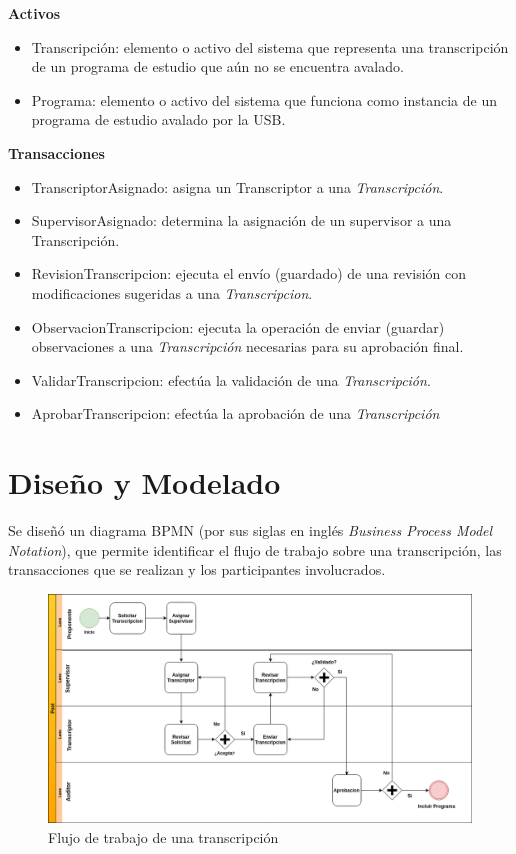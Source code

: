 \textbf{Activos} 
\begin{itemize}
    \item Transcripción: elemento o activo del sistema que representa una transcripción de un programa de estudio que aún no se encuentra avalado.
    \item Programa: elemento o activo del sistema que funciona como instancia de un programa de estudio avalado por la USB.
\end{itemize}

\textbf{Transacciones} 
\begin{itemize}
    \item TranscriptorAsignado: asigna un Transcriptor a una \textit{Transcripción}.
    \item SupervisorAsignado: determina la asignación de un supervisor a una Transcripción.
    \item RevisionTranscripcion: ejecuta el envío (guardado) de una revisión con modificaciones sugeridas a una \textit{Transcripcion}. 
    \item ObservacionTranscripcion: ejecuta la operación de enviar (guardar) observaciones a una \textit{Transcripción} necesarias para su aprobación final.
    \item ValidarTranscripcion: efectúa la validación de una \textit{Transcripción}.
    \item AprobarTranscripcion: efectúa la aprobación de una \textit{Transcripción}
\end{itemize}

\section{Diseño y Modelado}
 Se diseñó un diagrama BPMN (por sus siglas en inglés {\it Business Process Model Notation}), que permite identificar el flujo de trabajo sobre una transcripción, las transacciones que se realizan y los participantes involucrados. 
 
 \begin{figure}[H]
    \centering
    \includegraphics[width=1\textwidth]{flujo_transcripcion.png}
    \caption{Flujo de trabajo de una transcripción}
    \label{flujo_trabajo}
\end{figure}
 

